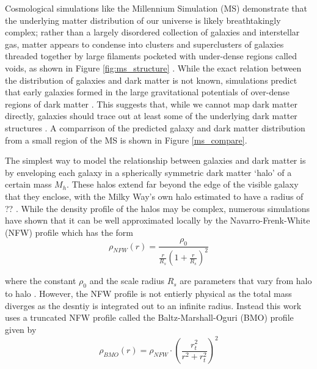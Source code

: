 \documentclass[%
 reprint,
 amsmath,amssymb,
 aps,nofootinbib
]{revtex4-1}
\begin{document}

Cosmological simulations like the Millennium Simulation (MS) demonstrate that the underlying matter distribution of our universe is likely breathtakingly complex; rather than a largely disordered collection of galaxies and interstellar gas, matter appears to condense into clusters and superclusters of galaxies threaded together by large filaments pocketed with under-dense regions called voids, as shown in Figure \ref{fig:ms_structure} \cite{??}. While the exact relation between the distribution of galaxies and dark matter is not known, simulations predict that early galaxies formed in the large gravitational potentials of over-dense regions of dark matter \cite{??}. This suggests that, while we cannot map dark matter directly, galaxies should trace out at least some of the underlying dark matter structures \cite{??}. A comparrison of the predicted galaxy and dark matter distribution from a small region of the MS is shown in Figure \ref{ms_compare}.


The simplest way to model the relationship between galaxies and dark matter is by enveloping each galaxy in a spherically symmetric dark matter `halo' of a certain mass $M_h$. These halos extend far beyond the edge of the visible galaxy that they enclose, with the Milky Way's own halo estimated to have a radius of ?? \cite{??}. While the density profile of the halos may be complex, numerous simulations have shown that it can be well approximated locally by the Navarro-Frenk-White (NFW) profile which has the form
\begin{equation}\label{nfw_profile}
\rho_{NFW}(r)=\frac{\rho_0}{\frac{r}{R_s}\left(1+\frac{r}{R_s}\right)^2}
\end{equation}

\noindent where the constant $\rho_0$ and the scale radius $R_s$ are parameters that vary from halo to halo \cite{nfw}. However, the NFW profile is not entierly physical as the total mass diverges as the desntiy is integrated out to an infinite radius. Instead this work uses a truncated NFW profile called the Baltz-Marshall-Oguri (BMO) profile given by
\begin{equation}\label{bmo_profile}
\rho_{BMO}(r)=\rho_{NFW}\cdot\left(\frac{r_t^2}{r^2+r_t^2}\right)^2
\end{equation}
\end{document}
